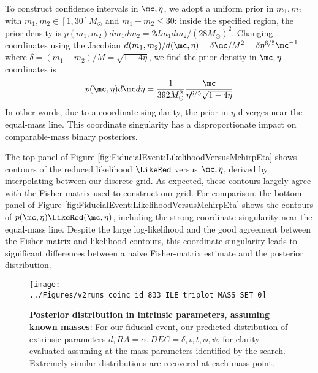 To construct confidence intervals in $\mc,\eta$, we adopt a uniform prior in $m_1,m_2$ with $m_1,m_2\in[1,30]M_\odot$
and $m_1+m_2\le 30$: inside the specified region, the prior density is $p(m_1,m_2)dm_1dm_2=2 dm_1 dm_2/(28 M_\odot)^2$.
Changing coordinates using the Jacobian $d(m_1,m_2)/d(\mc,\eta)= \delta \mc/M^2 = \delta \eta^{6/5}\mc^{-1}$ where
$\delta = (m_1-m_2)/M = \sqrt{1-4\eta}$, we find the prior density in $\mc,\eta$ coordinates is
\begin{eqnarray}
p(\mc,\eta) d\mc d\eta =  \frac{1}{392 M_\odot^2} \frac{\mc}{\eta^{6/5}\sqrt{1-4\eta}}
\end{eqnarray}
%
In other words, due to a coordinate singularity, the prior in $\eta$ diverges near the equal-mass line.  
%
This coordinate singularity has a disproportionate impact on comparable-mass binary posteriors.


The top panel of Figure \ref{fig:FiducialEvent:LikelihoodVersusMchirpEta} shows contours of the reduced likelihood $\LikeRed$ versus
$\mc,\eta$, derived by interpolating between our discrete grid.   As expected, these contours largely agree with the
Fisher matrix used to construct our grid. 
%
For comparison, the bottom panel of Figure \ref{fig:FiducialEvent:LikelihoodVersusMchirpEta} shows the contours of
$p(\mc,\eta)\LikeRed(\mc,\eta)$, including the strong coordinate singularity near the equal-mass line.  
%
Despite the large log-likelihood and the good agreement between the Fisher matrix and likelihood contours, this
coordinate singularity leads to significant differences between a naive 
Fisher-matrix estimate and the posterior distribution.



\begin{figure*}
\texttt{[image: ../Figures/v2runs\_coinc\_id\_833\_ILE\_triplot\_MASS\_SET\_0]}
\caption{\label{fig:FiducialEvent:Triplot:TriggerMasses}\textbf{Posterior distribution in intrinsic parameters, assuming known masses}: For our fiducial event, our predicted
  distribution of extrinsic parameters $d,RA=\alpha,DEC=\delta,\iota,t,\phi,\psi$, for clarity evaluated assuming at the
  mass parameters identified by the search.  Extremely similar distributions are recovered at each mass point. 
}
\end{figure*}


